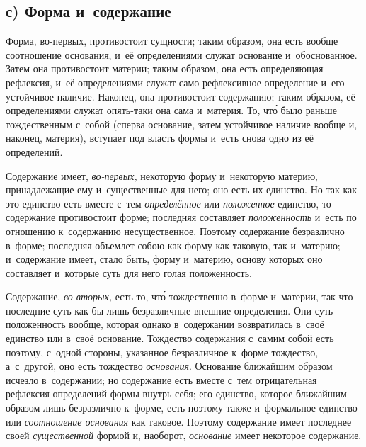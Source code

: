 \subsection[с) Форма и~содержание]{с) Форма и~содержание}

Форма, во-первых, противостоит сущности; таким образом, она есть вообще
соотношение основания, и~её определениями служат основание и~обоснованное.
Затем она противостоит материи; таким образом, она есть определяющая рефлексия,
и~её определениями служат само рефлексивное определение и~его устойчивое
наличие. Наконец, она противостоит содержанию; таким образом, её определениями
служат опять-таки она сама и~материя. То, чт\'{о} было раньше тождественным
с~собой (сперва основание, затем устойчивое наличие вообще и, наконец,
материя), вступает под власть формы и~есть снова одно из её определений.

Содержание имеет, {\em во-первых,} некоторую форму и~некоторую материю,
принадлежащие ему и~существенные для него; оно есть их единство. Но так как это
единство есть вместе с~тем {\em определённое} или {\em положенное} единство, то
содержание противостоит форме; последняя составляет {\em положенность} и~есть
по отношению к~содержанию несущественное. Поэтому содержание безразлично
в~форме; последняя объемлет собою как форму как таковую, так и~материю;
и~содержание имеет, стало быть, форму и~материю, основу которых оно составляет
и~которые суть для него голая положенность.

Содержание, {\em во-вторых,} есть то, чт\'{о} тождественно в~форме и~материи,
так что последние суть как бы лишь безразличные внешние определения. Они суть
положенность вообще, которая однако в~содержании возвратилась в~своё единство
или в~своё основание. Тождество содержания с~самим собой есть поэтому, с~одной
стороны, указанное безразличное к~форме тождество, а~с~другой, оно есть
тождество {\em основания}. Основание ближайшим образом исчезло в~содержании; но
содержание есть вместе с~тем отрицательная рефлексия определений формы внутрь
себя; его единство, которое ближайшим образом лишь безразлично к~форме, есть
поэтому также и~формальное единство или {\em соотношение основания} как
таковое. Поэтому содержание имеет последнее своей {\em существенной} формой и,
наоборот, {\em основание} имеет некоторое содержание.

